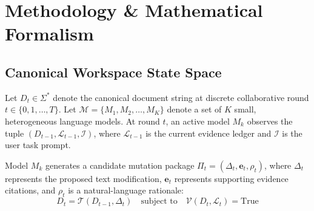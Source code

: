\documentclass[10pt,journal,compsoc]{IEEEtran}
\begin{document}
\section{Methodology \& Mathematical Formalism}

\subsection{Canonical Workspace State Space}
Let $D_t \in \Sigma^*$ denote the canonical document string at discrete collaborative round $t \in \{0, 1, \dots, T\}$. Let $\mathcal{M} = \{M_1, M_2, \dots, M_K\}$ denote a set of $K$ small, heterogeneous language models. At round $t$, an active model $M_k$ observes the tuple $(D_{t-1}, \mathcal{L}_{t-1}, \mathcal{I})$, where $\mathcal{L}_{t-1}$ is the current evidence ledger and $\mathcal{I}$ is the user task prompt.

Model $M_k$ generates a candidate mutation package $\Pi_t = (\Delta_t, \mathbf{e}_t, \rho_t)$, where $\Delta_t$ represents the proposed text modification, $\mathbf{e}_t$ represents supporting evidence citations, and $\rho_t$ is a natural-language rationale:
\begin{equation}
D_t = \mathcal{T}(D_{t-1}, \Delta_t) \quad \text{subject to} \quad \mathcal{V}(D_t, \mathcal{L}_t) = \text{True}
\end{equation}
\end{document}
